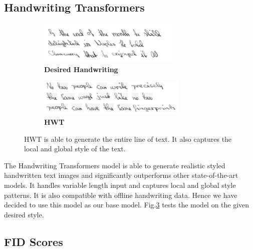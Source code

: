 \documentclass[10pt,twocolumn,letterpaper]{article}
\begin{document}
\subsection*{Handwriting Transformers}

\begin{figure}[h]
  \centering
  \begin{subfigure}[b]{0.45\textwidth}
    \includegraphics[width=\textwidth]{../latex-src/Images/Gan-Input1.png}
    \caption{\textbf{Desired Handwriting}}
    \label{fig:HWT-input}
  \end{subfigure}
  \hfill
  \begin{subfigure}[b]{0.45\textwidth}
    \includegraphics[width=\textwidth]{../latex-src/Images/HWT-Output1.png}
    \caption{\textbf{HWT}}
    \label{fig:HWT-output}
  \end{subfigure}
  \caption{{HWT is able to generate the entire line of text. It also captures the local and global style of the text.}}
  \label{fig:HWT}
\end{figure}

The Handwriting Transformers model \cite{HWT} is able to generate realistic styled handwritten text images and significantly outperforms other state-of-the-art models. It handles variable length input and captures local and global style patterns. It is also compatible with offline handwriting data. Hence we have decided to use this model as our base model. Fig.\ref{fig:HWT} tests the model on the given desired style.\\

\subsection*{FID Scores}
\end{document}
